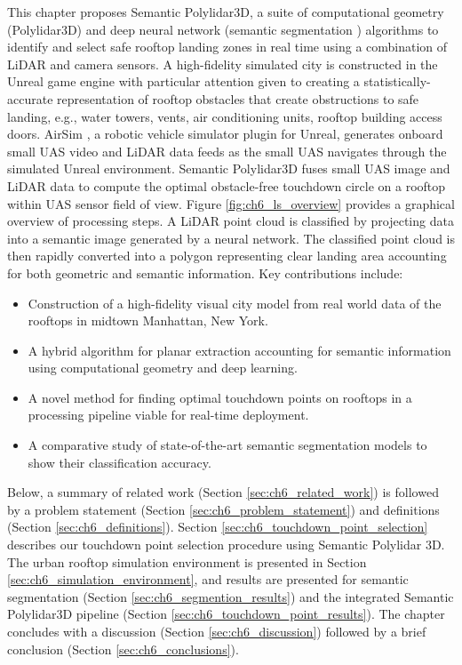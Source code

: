 This chapter proposes Semantic Polylidar3D, a suite of computational geometry (Polylidar3D) and deep neural network (semantic segmentation  \cite{howard_mobilenets_2017, ronneberger_u-net_2015}) algorithms to identify and select safe rooftop landing zones in real time using a combination of LiDAR and camera sensors.  A high-fidelity simulated city is constructed in the Unreal game engine \cite{unrealengine} with particular attention given to creating a statistically-accurate representation of rooftop obstacles that create obstructions to safe landing, e.g., water towers, vents, air conditioning units, rooftop building access doors.  AirSim \cite{shah_airsim_2018}, a robotic vehicle simulator plugin for Unreal, generates onboard small UAS video and LiDAR data feeds as the small UAS navigates through the simulated Unreal environment.  Semantic Polylidar3D fuses small UAS image and LiDAR data to compute the optimal obstacle-free touchdown circle on a rooftop within UAS sensor field of view. Figure \ref{fig:ch6_ls_overview} provides a graphical overview of processing steps. A LiDAR point cloud is classified by projecting data into a semantic image generated by a neural network. The classified point cloud is then rapidly converted into a polygon representing clear landing area accounting for both geometric and semantic information. Key contributions include:

\begin{itemize}
  \item Construction of a high-fidelity visual city model from real world data of the rooftops in midtown Manhattan, New York.
  \item A hybrid algorithm for planar extraction accounting for semantic information using computational geometry and deep learning.
  \item A novel method for finding optimal touchdown points on rooftops in a processing pipeline viable for real-time deployment. 
  \item A comparative study of state-of-the-art semantic segmentation models to show their classification accuracy.
\end{itemize}

Below, a summary of related work (Section \ref{sec:ch6_related_work}) is followed by a problem statement (Section \ref{sec:ch6_problem_statement}) and definitions (Section \ref{sec:ch6_definitions}).  Section \ref{sec:ch6_touchdown_point_selection} describes our touchdown point selection procedure using Semantic Polylidar 3D.  The urban rooftop simulation environment is presented in Section \ref{sec:ch6_simulation_environment}, and results are presented for semantic segmentation (Section \ref{sec:ch6_segmention_results}) and the integrated Semantic Polylidar3D pipeline (Section \ref{sec:ch6_touchdown_point_results}).  The chapter concludes with a discussion (Section \ref{sec:ch6_discussion}) followed by a brief conclusion (Section \ref{sec:ch6_conclusions}).

